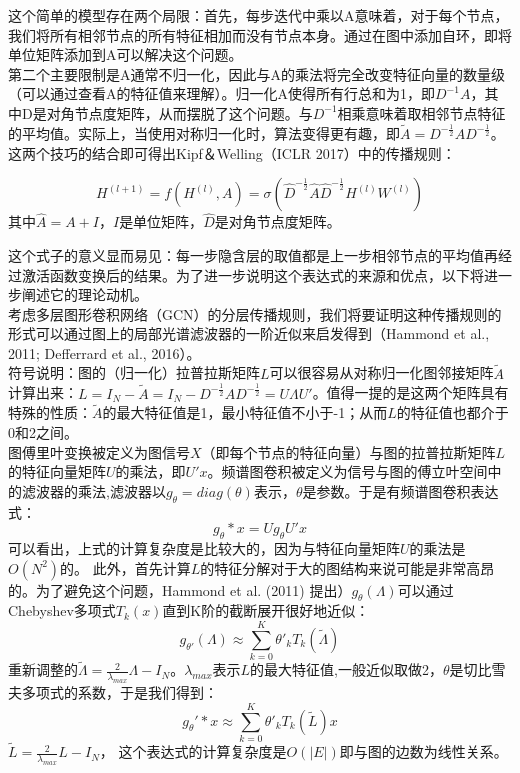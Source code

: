 \documentclass[a4paper,UTF8]{article}
\begin{document}
这个简单的模型存在两个局限：首先，每步迭代中乘以A意味着，对于每个节点，我们将所有相邻节点的所有特征相加而没有节点本身。通过在图中添加自环，即将单位矩阵添加到A可以解决这个问题。\\

第二个主要限制是A通常不归一化，因此与A的乘法将完全改变特征向量的数量级（可以通过查看A的特征值来理解）。归一化A使得所有行总和为1，即$D^{-1}A$，其中D是对角节点度矩阵，从而摆脱了这个问题。与$D^{-1}$相乘意味着取相邻节点特征的平均值。实际上，当使用对称归一化时，算法变得更有趣，即$\widetilde{A}={D}^{-\frac{1}{2}} {A} {D}^{-\frac{1}{2}} $。这两个技巧的结合即可得出Kipf＆Welling（ICLR 2017）中的传播规则：

\[ H^{(l+1)} = f(H^{(l)},A) = \sigma \left( \hat{D}^{-\frac{1}{2}} \hat{A} \hat{D}^{-\frac{1}{2}} H^{(l)}W^{(l)}\right)\]
其中$\hat{A}= A + I$，$I$是单位矩阵，$\hat{D}$是对角节点度矩阵。

这个式子的意义显而易见：每一步隐含层的取值都是上一步相邻节点的平均值再经过激活函数变换后的结果。为了进一步说明这个表达式的来源和优点，以下将进一步阐述它的理论动机。\\

考虑多层图形卷积网络（GCN）的分层传播规则，我们将要证明这种传播规则的形式可以通过图上的局部光谱滤波器的一阶近似来启发得到（Hammond et al., 2011; Defferrard et al., 2016）。\\

符号说明：图的（归一化）拉普拉斯矩阵$L$可以很容易从对称归一化图邻接矩阵$\widetilde{A}$计算出来：$L = I_N-\widetilde{A} = I_N-{D}^{-\frac{1}{2}} {A} {D}^{-\frac{1}{2}} = U \Lambda U'$。值得一提的是这两个矩阵具有特殊的性质：$\widetilde{A}$的最大特征值是1，最小特征值不小于-1；从而$L$的特征值也都介于0和2之间。\\

图傅里叶变换被定义为图信号$X$（即每个节点的特征向量）与图的拉普拉斯矩阵$L$的特征向量矩阵$U$的乘法，即$U'x$。频谱图卷积被定义为信号与图的傅立叶空间中的滤波器的乘法,滤波器以$g_\theta=diag(\theta)$表示，$\theta$是参数。于是有频谱图卷积表达式：
$$g_\theta \ast x = U g_\theta U' x$$
可以看出，上式的计算复杂度是比较大的，因为与特征向量矩阵$U$的乘法是$O(N^2)$的。 此外，首先计算$L$的特征分解对于大的图结构来说可能是非常高昂的。为了避免这个问题，Hammond et al. (2011) 提出）$g_{\theta}(\Lambda)$可以通过Chebyshev多项式$T_k(x)$直到K阶的截断展开很好地近似：
$$g_{\theta'}(\Lambda)\approx\sum\limits_{k=0}^K \theta'_k T_k(\widetilde{\Lambda})$$
重新调整的$\widetilde{\Lambda}=\frac{2}{\lambda_{max}}\Lambda-I_N$。$\lambda_{max}$表示$L$的最大特征值,一般近似取做2，$\theta$是切比雪夫多项式的系数，于是我们得到：
$$g_\theta' \ast x \approx \sum\limits_{k=0}^K \theta'_k T_k(\widetilde{L})x $$
$\widetilde{L}=\frac{2}{\lambda_{max}}L-I_N$，
这个表达式的计算复杂度是$O(\vert E \vert)$即与图的边数为线性关系。
\end{document}
